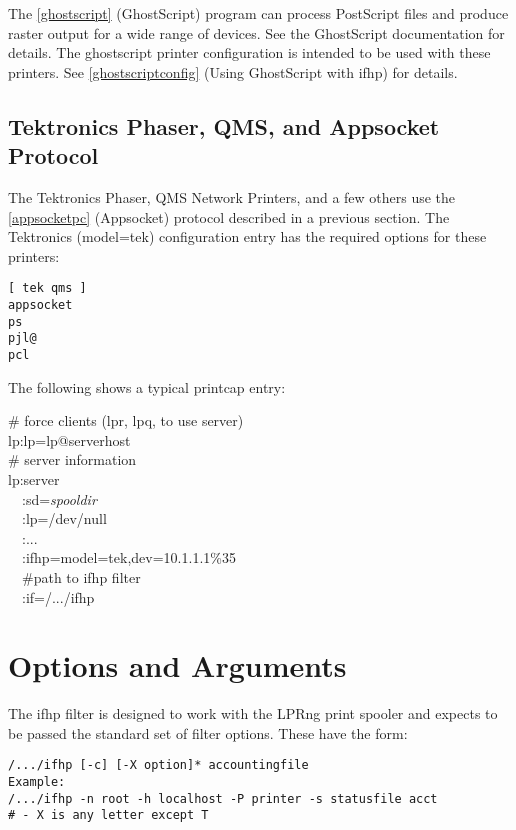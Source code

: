 \documentclass[a4paper]{article}
\begin{document}
The \ref{ghostscript} {(GhostScript)}
program can process PostScript files and produce raster output for a
wide range of devices.
See the GhostScript documentation for details.
The {\ttfamily ghostscript} printer configuration is intended to be used
with these printers.
See
\ref{ghostscriptconfig} {(Using GhostScript with ifhp)}
for details.


\subsection{Tektronics Phaser, QMS, and Appsocket Protocol
\label{phaser}}

The Tektronics Phaser, QMS Network Printers,
and a few others use the
\ref{appsocketpc} {(Appsocket)} protocol described
in a previous section.
The Tektronics ({\ttfamily model=tek}) configuration entry
has the required options for these printers:
\begin{tscreen}
\begin{verbatim}
[ tek qms ]
appsocket
ps
pjl@
pcl
\end{verbatim}
\end{tscreen}


The following shows a typical printcap entry:
\begin{tscreen}
\#  force clients (lpr, lpq, to use server)\\ 
lp:lp=lp@serverhost \\ 
\# server information  \\ 
lp:server  \\ 
~~:sd={\itshape spooldir\/} \\ 
~~:lp=/dev/null     \\ 
~~:...  \\ 
~~:ifhp=model=tek,dev=10.1.1.1\%35 \\ 
~~\#path to ifhp filter  \\ 
~~:if=/.../ifhp  \\ 
\end{tscreen}



\section{Options and Arguments
\label{options}
\label{model}
\label{model_from_option}}

The {\ttfamily ifhp} filter is designed to work with the LPRng print spooler
and expects to be passed the standard set of filter options.
These have the form:
\begin{tscreen}
\begin{verbatim}
/.../ifhp [-c] [-X option]* accountingfile
Example:
/.../ifhp -n root -h localhost -P printer -s statusfile acct
# - X is any letter except T
\end{verbatim}
\end{tscreen}
\end{document}
